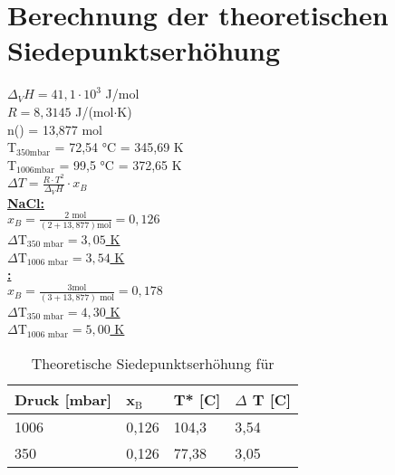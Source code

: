 \section*{Berechnung der theoretischen Siedepunktserhöhung}
	$\Delta _V H = 41,1 \cdot 10^3$ J/mol \\
	$R = 8,3145$ J/(mol$\cdot$K) \\
	\newline
	n() = 13,877 mol \\
	T$_{350\text{mbar}}$ = 72,54 °C = 345,69 K \\
	T$_{1006\text{mbar}}$ = 99,5 °C = 372,65 K \\
	\newline
	$\Delta T = \frac{R \cdot T^2}{\Delta _{V}H} \cdot x_{B}$ \\
	\newline
	\newline
	\underline{\textbf{NaCl:}} \\
	\newline
	$x_B = \frac{2 \textrm{ mol}}{(2 + 13,877)\textrm{mol}} = 0,126$\\
	\newline
	\underline{\underline{$\Delta \text{T}_{350 \text{ mbar}} = 3,05$ K}} \\ 
	\newline
	\underline{\underline{$\Delta \text{T}_{1006 \text{ mbar}} = 3,54$ K}} \\
	\newline
	\newline
	\underline{\textbf{:}} \\
	\newline
	$x_B = \frac{3 \textrm{mol}}{(3 + 13,877)\textrm{ mol}} = 0,178$\\
	\newline
	\underline{\underline{$\Delta \text{T}_{350 \text{ mbar}} = 4,30$ K}} \\ 
	\newline
	\underline{\underline{$\Delta \text{T}_{1006 \text{ mbar}} = 5,00$ K}} \\	

	\begin{table}[H]
		\centering
		\label{tab:Siedepunkt_NaCl}
			\begin{tabular}{|l|l|l|l|}
			\hline
			\textbf{Druck [mbar]}	&	\textbf{x$_\text{B}$}	&	\textbf{T* [C]} & \textbf{$\Delta$ T [C]} \\\hline
			1006	&	0,126	&	104,3	&	3,54 \\
			350		&	0,126	&	77,38	&	3,05 \\\hline
			\end{tabular}
			\caption{Theoretische Siedepunktserhöhung für }
	\end{table} 
	
